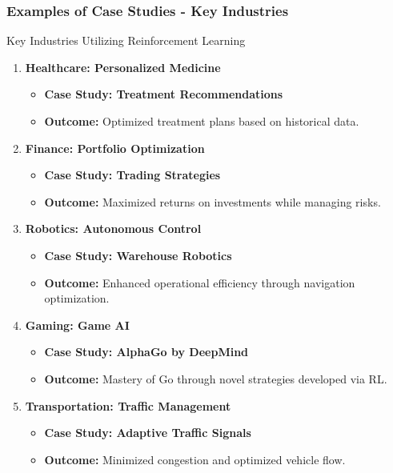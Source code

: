 \documentclass[aspectratio=169]{beamer}
\begin{document}
\begin{frame}[fragile]
    \frametitle{Examples of Case Studies - Key Industries}
    \begin{block}{Key Industries Utilizing Reinforcement Learning}
        \begin{enumerate}
            \item \textbf{Healthcare: Personalized Medicine}
                \begin{itemize}
                    \item \textbf{Case Study: Treatment Recommendations}
                    \item \textbf{Outcome:} Optimized treatment plans based on historical data.
                \end{itemize}
                
            \item \textbf{Finance: Portfolio Optimization}
                \begin{itemize}
                    \item \textbf{Case Study: Trading Strategies}
                    \item \textbf{Outcome:} Maximized returns on investments while managing risks.
                \end{itemize}
                
            \item \textbf{Robotics: Autonomous Control}
                \begin{itemize}
                    \item \textbf{Case Study: Warehouse Robotics}
                    \item \textbf{Outcome:} Enhanced operational efficiency through navigation optimization.
                \end{itemize}
                
            \item \textbf{Gaming: Game AI}
                \begin{itemize}
                    \item \textbf{Case Study: AlphaGo by DeepMind}
                    \item \textbf{Outcome:} Mastery of Go through novel strategies developed via RL.
                \end{itemize}

            \item \textbf{Transportation: Traffic Management}
                \begin{itemize}
                    \item \textbf{Case Study: Adaptive Traffic Signals}
                    \item \textbf{Outcome:} Minimized congestion and optimized vehicle flow.
                \end{itemize}
        \end{enumerate}
    \end{block}
\end{frame}
\end{document}
